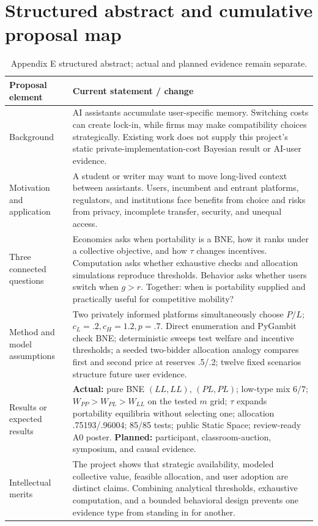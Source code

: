 \section{Structured abstract and cumulative proposal map}\label{app:abstract}
\begin{table}[H]
\caption{Appendix E structured abstract; actual and planned evidence remain separate.}
\label{tab:abstract-map}
\renewcommand{\arraystretch}{1.18}
\begin{tabularx}{\textwidth}{@{}p{}Y@{}}
\toprule
\textbf{Proposal element} & \textbf{Current statement / change} \\
\midrule
Background & AI assistants accumulate user-specific memory. Switching costs can create lock-in, while firms may make compatibility choices strategically. Existing work does not supply this project's static private-implementation-cost Bayesian result or AI-user evidence. \\
Motivation and application & A student or writer may want to move long-lived context between assistants. Users, incumbent and entrant platforms, regulators, and institutions face benefits from choice and risks from privacy, incomplete transfer, security, and unequal access. \\
Three connected questions & Economics asks when portability is a BNE, how it ranks under a collective objective, and how $\tau$ changes incentives. Computation asks whether exhaustive checks and allocation simulations reproduce thresholds. Behavior asks whether users switch when $g>r$. Together: when is portability supplied and practically useful for competitive mobility? \\
Method and model assumptions & Two privately informed platforms simultaneously choose $P/L$; $c_L=.2,c_H=1.2,p=.7$. Direct enumeration and PyGambit check BNE; deterministic sweeps test welfare and incentive thresholds; a seeded two-bidder allocation analogy compares first and second price at reserves .5/.2; twelve fixed scenarios structure future user evidence. \\
Results or expected results & \textbf{Actual:} pure BNE $(LL,LL)$, $(PL,PL)$; low-type mix $6/7$; $W_{PP}>W_{PL}>W_{LL}$ on the tested $m$ grid; $\tau$ expands portability equilibria without selecting one; allocation .75193/.96004; 85/85 tests; public Static Space; review-ready A0 poster. \textbf{Planned:} participant, classroom-auction, symposium, and causal evidence. \\
Intellectual merits & The project shows that strategic availability, modeled collective value, feasible allocation, and user adoption are distinct claims. Combining analytical thresholds, exhaustive computation, and a bounded behavioral design prevents one evidence type from standing in for another. \\

\end{tabularx}
\end{table}
